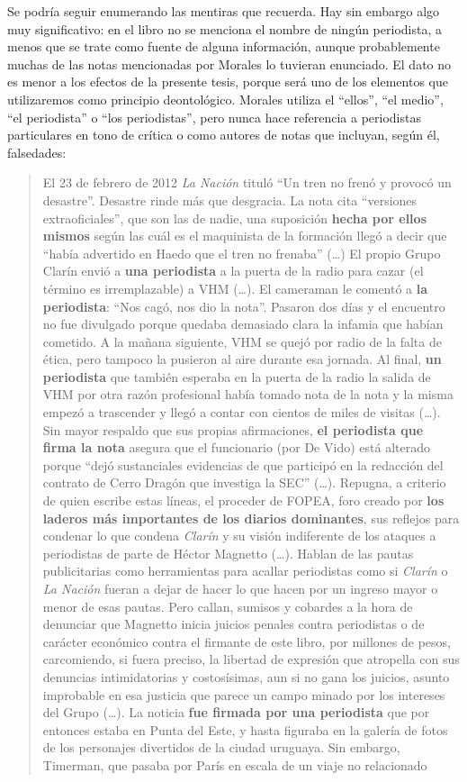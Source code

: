 Se podría seguir enumerando las mentiras que recuerda. Hay sin embargo algo muy significativo: en el libro no se menciona el nombre de ningún periodista, a menos que se trate como fuente de alguna información, aunque probablemente muchas de las notas mencionadas por Morales lo tuvieran enunciado. El dato no es menor a los efectos de la presente tesis, porque será uno de los elementos que utilizaremos como principio deontológico. Morales utiliza el ``ellos'', ``el medio'', ``el periodista'' o ``los periodistas'', pero nunca hace referencia a periodistas particulares en tono de crítica o como autores de notas que incluyan, según él, falsedades:

\begin{quote}
El 23 de febrero de 2012 \emph{La Nación} tituló ``Un tren no frenó y provocó un desastre''. Desastre rinde más que desgracia. La nota cita ``versiones extraoficiales'', que son las de nadie, una suposición \textbf{hecha por ellos mismos} según las cuál es el maquinista de la formación llegó a decir que ``había advertido en Haedo que el tren no frenaba'' (\ldots) El propio Grupo Clarín envió a \textbf{una periodista} a la puerta de la radio para cazar (el término es irremplazable) a VHM (\ldots). El cameraman le comentó a \textbf{la periodista}: ``Nos cagó, nos dio la nota''. Pasaron dos días y el encuentro no fue divulgado porque quedaba demasiado clara la infamia que habían cometido. A la mañana siguiente, VHM se quejó por radio de la falta de ética, pero tampoco la pusieron al aire durante esa jornada. Al final, \textbf{un periodista} que también esperaba en la puerta de la radio la salida de VHM por otra razón profesional había tomado nota de la nota y la misma empezó a trascender y llegó a contar con cientos de miles de visitas (\ldots). Sin mayor respaldo que sus propias afirmaciones, \textbf{el periodista que firma la nota} asegura que el funcionario (por De Vido) está alterado porque ``dejó sustanciales evidencias de que participó en la redacción del contrato de Cerro Dragón que investiga la SEC'' (\ldots). Repugna, a criterio de quien escribe estas líneas, el proceder de FOPEA, foro creado por \textbf{los laderos más importantes de los diarios dominantes}, sus reflejos para condenar lo que condena \emph{Clarín} y su visión indiferente de los ataques a periodistas de parte de Héctor Magnetto (\ldots). Hablan de las pautas publicitarias como herramientas para acallar periodistas como si \emph{Clarín} o \emph{La Nación} fueran a dejar de hacer lo que hacen por un ingreso mayor o menor de esas pautas. Pero callan, sumisos y cobardes a la hora de denunciar que Magnetto inicia juicios penales contra periodistas o de carácter económico contra el firmante de este libro, por millones de pesos, carcomiendo, si fuera preciso, la libertad de expresión que atropella con sus denuncias intimidatorias y costosísimas, aun si no gana los juicios, asunto improbable en esa justicia que parece un campo minado por los intereses del Grupo (\ldots). La noticia \textbf{fue firmada por una periodista} que por entonces estaba en Punta del Este, y hasta figuraba en la galería de fotos de los personajes divertidos de la ciudad uruguaya. Sin embargo, Timerman, que pasaba por París en escala de un viaje no relacionado 
\end{quote}
